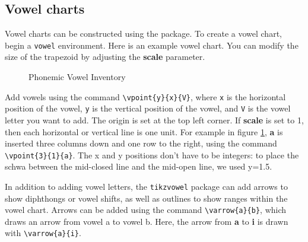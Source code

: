 \subsection*{Vowel charts}

Vowel charts can be constructed using the  package. To create a vowel chart, begin a \texttt{vowel} environment. Here is an example vowel chart. You can modify the size of the trapezoid by adjusting the \textbf{scale} parameter.

\begin{figure}[H]
  \centering
  \begin{vowel}[scale=0.75]
  \end{vowel}
  \caption{Phonemic Vowel Inventory}
  \label{table:vowel_phonemes}
\end{figure}
\begin{verbbox}
  \begin{vowel}[scale=0.75]
  \end{vowel}
\end{verbbox}
\fbox{\theverbbox} 

Add vowels using the command \texttt{\textbackslash vpoint\{y\}\{x\}\{V\}}, where \texttt{x} is the horizontal position of the vowel, \texttt{y} is the vertical position of the vowel, and \texttt{V} is the vowel letter you want to add. The origin is set at the top left corner. If \textbf{scale} is set to 1, then each horizontal or vertical line is one unit. For example in figure \ref{table:vowel_phonemes}, \textbf{a} is inserted three columns down and one row to the right, using the command \texttt{\textbackslash vpoint\{3\}\{1\}\{a\}}. The x and y positions don't have to be integers: to place the schwa between the mid-closed line and the mid-open line, we used y=1.5.

In addition to adding vowel letters, the \texttt{tikzvowel} package can add arrows to show diphthongs or vowel shifts, as well as outlines to show ranges within the vowel chart. Arrows can be added using the command \texttt{\textbackslash varrow\{a\}\{b\}}, which draws an arrow from vowel a to vowel b. Here, the arrow from \textbf{a} to \textbf{i} is drawn with \texttt{\textbackslash varrow\{a\}\{i\}}. 

